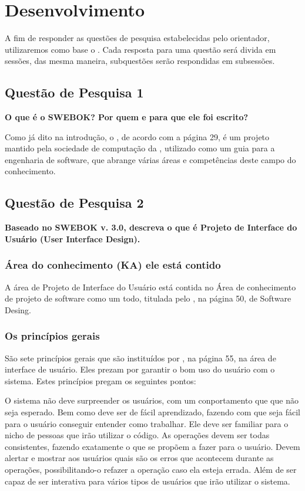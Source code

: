 \chapter[Desenvolvimento ]{Desenvolvimento}

A fim de responder as questões de pesquisa estabelecidas pelo orientador,
utilizaremos como base o \cite{swebok} . Cada resposta para uma questão
será divida em sessões, das mesma maneira, subquestões serão respondidas em
subsessões.

\section[Questão de Pesquisa 1]{Questão de Pesquisa 1}
\textbf{O que é o SWEBOK? Por quem e para que ele foi escrito?}


Como já dito na introdução, o \cite[swebok]{swebok}, de acordo com a página 29,
é um projeto mantido pela
sociedade de computação da \cite[ieee]{ieee} , utilizado como um guia para a
engenharia de software, que abrange várias áreas e competências deste campo do
conhecimento.

\section[Questão de Pesquisa 2]{Questão de Pesquisa 2}
\textbf{Baseado no SWEBOK v. 3.0, descreva o que é Projeto de Interface do
Usuário (User Interface Design).}

\subsection[Área do conhecimento (KA) ele está contido]{Área do conhecimento (KA) ele está contido}

A área de Projeto de Interface do Usuário está contida no Área de conhecimento
de projeto de software como um todo, titulada pelo \cite[swebok]{swebok}, na página 50,
de Software Desing.

\subsection[Os princípios gerais]{Os princípios gerais}
São sete princípios gerais que são instituídos por \cite{swebok}, na página 55,
na área de interface
de usuário. Eles prezam por garantir o bom uso do usuário com o sistema. Estes
princípios pregam os seguintes pontos:

O sistema não deve surpreender os usuários, com um conportamento que que não seja
esperado. Bem como deve ser de fácil aprendizado, fazendo com que seja fácil para
o usuário conseguir entender como trabalhar. Ele deve ser familiar para o nicho
de pessoas que irão utilizar o código. As operações devem ser todas consistentes,
fazendo exatamente o que se propõem a fazer para o usuário. Devem alertar e mostrar
aos usuários quais são os erros que acontecem durante as operações, possibilitando-o
refazer a operação caso ela esteja errada. Além de ser capaz de ser interativa
para vários tipos de usuários que irão utilizar o sistema.

